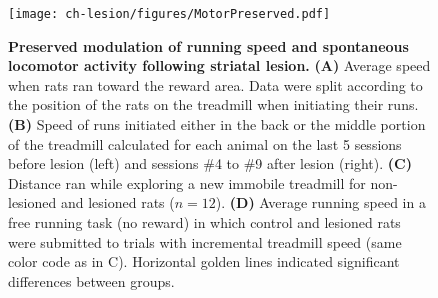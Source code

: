 \begin{figure}[bth!]
 \begin{center}
	\texttt{[image: ch-lesion/figures/MotorPreserved.pdf]}
	\caption[Preserved Motor Control After Striatal Lesion]
	{\textbf{Preserved modulation of running speed and spontaneous locomotor activity following striatal lesion.}
	\textbf{(A)} Average speed when rats ran toward the reward area. Data were split according to the position of the rats on the treadmill when initiating their runs.
	\textbf{(B)} Speed of runs initiated either in the back or the middle portion of the treadmill calculated for each animal on the last 5 sessions before lesion (left) and sessions \#4 to \#9 after lesion (right).
	\textbf{(C)} Distance ran while exploring a new immobile treadmill for non-lesioned and lesioned rats ($n=12$).
	\textbf{(D)} Average running speed in a free running task (no reward) in which control and lesioned rats were submitted to trials with incremental treadmill speed (same color code as in C).
	Horizontal golden lines indicated significant differences between groups.
	}
	\label{fig:lesion:motorOk}
 \end{center}
\end{figure}